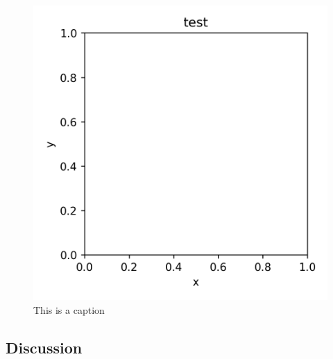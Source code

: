\documentclass[11pt,a4paper, twocolumn]{article}
\begin{document}
    \begin{figure}[H]
      \center
      \includegraphics[scale=.75]{figs/testfile.png}
      \caption{This is a caption}
    \end{figure}

  \subsection{Discussion}
\end{document}
